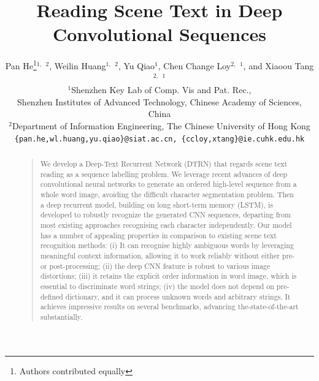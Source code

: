 \documentclass[letterpaper]{article}
\begin{document}
%
\title{Reading Scene Text in Deep Convolutional Sequences}
\newcommand*\samethanks[1][\value{footnote}]{\footnotemark[#1]}
\author{Pan He\thanks{Authors contributed equally}$^{1,}$ $^2$, Weilin Huang\samethanks$^{1,}$ $^2$, Yu Qiao$^1$, Chen Change Loy$^{2,}$ $^1$, and Xiaoou Tang$^{2,}$ $^1$
       \\
       $^1$Shenzhen Key Lab of Comp. Vis and Pat. Rec.,
       \\
       Shenzhen Institutes of Advanced Technology, Chinese Academy of Sciences, China
       \\
       $^2$Department of Information Engineering, The Chinese University of Hong Kong\\
       \texttt{\{pan.he,wl.huang,yu.qiao\}@siat.ac.cn, \{ccloy,xtang\}@ie.cuhk.edu.hk}
}




\maketitle
\begin{abstract}
\begin{quote}
We develop a Deep-Text Recurrent Network (DTRN) that regards scene text reading as a sequence labelling problem. We leverage recent advances of deep convolutional neural networks to generate an ordered high-level sequence from a whole word image, avoiding the difficult character segmentation problem.  Then a deep recurrent model, building on long short-term memory (LSTM), is developed to robustly recognize the generated CNN sequences, departing from most existing approaches recognising each character independently. Our model has a number of appealing properties in comparison to existing scene text recognition methods: (i) It can recognise highly ambiguous words by leveraging meaningful context information, allowing it to work reliably without either pre- or post-processing; (ii) the deep CNN feature is robust to various image distortions; (iii) it retains the explicit order information in word image, which is essential to discriminate word strings; (iv) the model does not depend on pre-defined dictionary, and it can process unknown words and arbitrary strings.
%
It achieves impressive results on several benchmarks, advancing  the-state-of-the-art substantially.

\end{quote}
\end{abstract}
\end{document}
